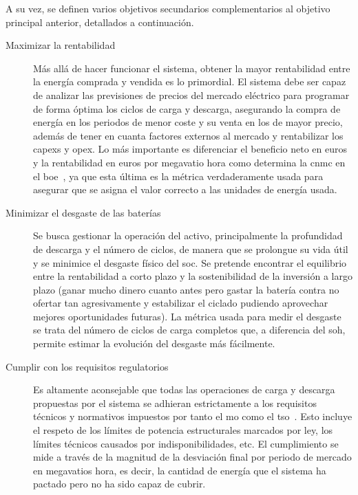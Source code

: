A su vez, se definen varios objetivos secundarios complementarios al objetivo principal anterior, detallados a continuación.

\begin{description}

  \item[Maximizar la rentabilidad] Más allá de hacer funcionar el sistema, obtener la mayor rentabilidad entre la energía comprada y vendida es lo primordial. El sistema debe ser capaz de analizar las previsiones de precios del mercado eléctrico para programar de forma óptima los ciclos de carga y descarga, asegurando la compra de energía en los periodos de menor coste y su venta en los de mayor precio, además de tener en cuanta factores externos al mercado y rentabilizar los \glspl{capex} y \gls{opex}. Lo más importante es diferenciar el beneficio neto en euros y la rentabilidad en euros por megavatio hora como determina la \gls{cnmc} en el \gls{boe}~\cite{cnmc2025resolucion}, ya que esta última es la métrica verdaderamente usada para asegurar que se asigna el valor correcto a las unidades de energía usada.

  \item[Minimizar el desgaste de las baterías] Se busca gestionar la operación del activo, principalmente la profundidad de descarga y el número de ciclos, de manera que se prolongue su vida útil y se minimice el desgaste físico del \gls{soc}. Se pretende encontrar el equilibrio entre la rentabilidad a corto plazo y la sostenibilidad de la inversión a largo plazo (ganar mucho dinero cuanto antes pero gastar la batería contra no ofertar tan agresivamente y estabilizar el ciclado pudiendo aprovechar mejores oportunidades futuras). La métrica usada para medir el desgaste se trata del número de ciclos de carga completos que, a diferencia del \gls{soh}, permite estimar la evolución del desgaste más fácilmente.

  \item[Cumplir con los requisitos regulatorios] Es altamente aconsejable que todas las operaciones de carga y descarga propuestas por el sistema se adhieran estrictamente a los requisitos técnicos y normativos impuestos por tanto el \gls{mo} como el \gls{tso}~\cite{crespo2004resolucion}. Esto incluye el respeto de los límites de potencia estructurales marcados por ley, los límites técnicos causados por indisponibilidades, etc. El cumplimiento se mide a través de la magnitud de la desviación final por periodo de mercado en megavatios hora, es decir, la cantidad de energía que el sistema ha pactado pero no ha sido capaz de cubrir.


\end{description}
